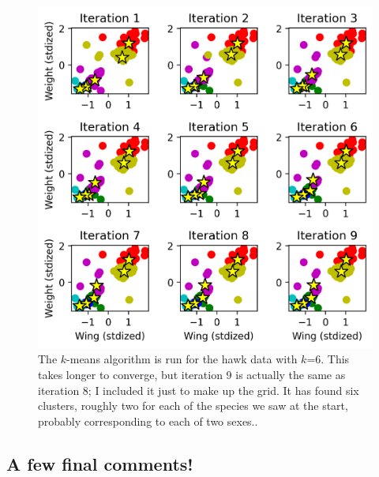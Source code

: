 \documentclass[12pt]{article}
\begin{document}
\begin{figure}[htb]
\begin{center}  
  \includegraphics{04.1_khawks_k6.png}
\end{center}
\caption{The $k$-means algorithm is run for the hawk data with
  $k$=6. This takes longer to converge, but iteration 9 is actually
  the same as iteration 8; I included it just to make up the grid. It
  has found six clusters, roughly two for each of the species we saw
  at the start, probably corresponding to each of two
  sexes..\label{fig:khawksk6}}
\end{figure}

\subsection*{A few final comments!}
\end{document}
